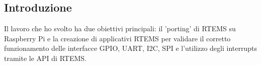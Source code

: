 \documentclass[12pt, a4paper, titlepage, oneside]{book}
\begin{document}

\tableofcontents
\setcounter{page}{0}
\begin{flushleft}
\chapter*{Introduzione}
\setcounter{page}{1}

Il lavoro che ho svolto ha due obiettivi principali: il 'porting' di RTEMS su Raspberry Pi e la creazione di applicativi RTEMS per validare il corretto funzionamento delle interfacce GPIO, UART, I2C, SPI  e l'utilizzo degli interrupts tramite le API di RTEMS.\\


\end{flushleft}
\end{document}
